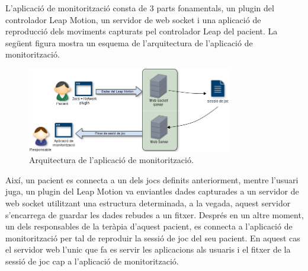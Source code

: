 \documentclass[12pt,a4paper,catalan]{article}
\begin{document}
	L'aplicació de monitorització consta de 3 parts fonamentals, un plugin del controlador Leap Motion, un servidor de web socket i una aplicació de reproducció dels moviments capturats pel controlador Leap del pacient. La següent figura mostra un esquema de l'arquitectura de l'aplicació de monitorització.
	\begin{figure}[H]
		\includegraphics[width=0.8\textwidth,keepaspectratio]{esquema-monitoritzacio.png}
		\centering
		\caption{Arquitectura de l'aplicació de monitorització.}
		\label{fig:arquitectura-monitoritzacio}
	\end{figure}
	Així, un pacient es connecta a un dels jocs definits anteriorment, mentre l'usuari juga, un plugin del Leap Motion va enviantles dades capturades a un servidor de web socket utilitzant una estructura determinada, a la vegada, aquest servidor s'encarrega de guardar les dades rebudes a un fitxer. Després en un altre moment, un dels responsables de la teràpia d'aquest pacient, es connecta a l'aplicació de monitorització per tal de reproduir la sessió de joc del seu pacient. En aquest cas el servidor web l'unic que fa es servir les aplicacions als usuaris i el fitxer de la sessió de joc cap a l'aplicació de monitorització.
\end{document}
